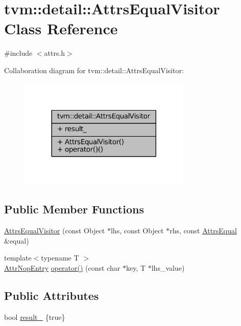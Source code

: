 \hypertarget{classtvm_1_1detail_1_1AttrsEqualVisitor}{}\section{tvm\+:\+:detail\+:\+:Attrs\+Equal\+Visitor Class Reference}
\label{classtvm_1_1detail_1_1AttrsEqualVisitor}


{\ttfamily \#include $<$attrs.\+h$>$}



Collaboration diagram for tvm\+:\+:detail\+:\+:Attrs\+Equal\+Visitor\+:
\nopagebreak
\begin{figure}[H]
\begin{center}
\leavevmode
\includegraphics[width=233pt]{classtvm_1_1detail_1_1AttrsEqualVisitor__coll__graph}
\end{center}
\end{figure}
\subsection*{Public Member Functions}
\begin{DoxyCompactItemize}
\item 
\hyperlink{classtvm_1_1detail_1_1AttrsEqualVisitor_a52b47272211c0223868c03a3c39a85cf}{Attrs\+Equal\+Visitor} (const Object $\ast$lhs, const Object $\ast$rhs, const \hyperlink{classtvm_1_1AttrsEqual}{Attrs\+Equal} \&equal)
\item 
{\footnotesize template$<$typename T $>$ }\\\hyperlink{structtvm_1_1detail_1_1AttrNopEntry}{Attr\+Nop\+Entry} \hyperlink{classtvm_1_1detail_1_1AttrsEqualVisitor_aa0b64b3e89858c3402ea553d402bbee1}{operator()} (const char $\ast$key, T $\ast$lhs\+\_\+value)
\end{DoxyCompactItemize}
\subsection*{Public Attributes}
\begin{DoxyCompactItemize}
\item 
bool \hyperlink{classtvm_1_1detail_1_1AttrsEqualVisitor_a3903dd9e71e23344f1a807644d43707f}{result\+\_\+} \{true\}
\end{DoxyCompactItemize}


